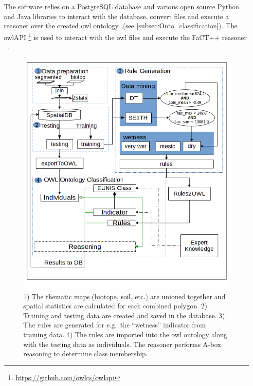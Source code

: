 \documentclass[authoryear,review,12pt,number]{elsarticle}
\begin{document}
The software relies on a PostgreSQL database and various open source Python and 
Java libraries to interact with the database, convert files and execute a 
reasoner over the created \gls{owl} ontology ‚(see 
\ref{subsec:Onto_classification}). The \gls{owl}API 
\footnote{\url{https://github.com/owlcs/owlapi}} is used to interact with the 
\gls{owl} files and execute the FaCT++ reasoner ~\citep{Tsarkov2006}. 
\begin{figure}
\includegraphics[width=1\linewidth]{diagrams/final_workflow_diagram.png}
\caption
    {
        1) The thematic maps (biotope, soil, etc.) are unioned together and
        spatial statistics are calculated for each combined polygon.
        2) Training and testing data are created and saved in the database.
        3) The rules are generated for e.g.\ the ``wetness'' indicator from
        training data.
        4) The rules are imported into the \gls{owl} ontology along with the 
testing
        data as individuals. The reasoner performs A-box reasoning to determine
        class membership.
    \label{fig:full_workflow}}
\end{figure}
\end{document}

